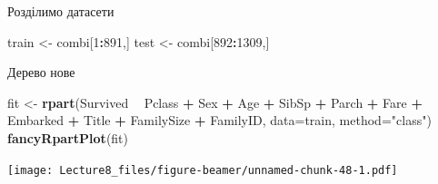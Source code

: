 \documentclass[ignorenonframetext,]{beamer}
\newenvironment{Shaded}{\begin{snugshade}}{\end{snugshade}}
\newcommand{\DataTypeTok}[1]{\textcolor[rgb]{0.13,0.29,0.53}{#1}}
\newcommand{\DecValTok}[1]{\textcolor[rgb]{0.00,0.00,0.81}{#1}}
\newcommand{\KeywordTok}[1]{\textcolor[rgb]{0.13,0.29,0.53}{\textbf{#1}}}
\newcommand{\NormalTok}[1]{#1}
\newcommand{\OperatorTok}[1]{\textcolor[rgb]{0.81,0.36,0.00}{\textbf{#1}}}
\newcommand{\StringTok}[1]{\textcolor[rgb]{0.31,0.60,0.02}{#1}}
\begin{document}
\begin{frame}[fragile]{Розділимо датасети}
\protect\hypertarget{ux440ux43eux437ux434ux456ux43bux438ux43cux43e-ux434ux430ux442ux430ux441ux435ux442ux438}{}

\begin{Shaded}
\begin{Highlighting}[]
\NormalTok{train <-}\StringTok{ }\NormalTok{combi[}\DecValTok{1}\OperatorTok{:}\DecValTok{891}\NormalTok{,]}
\NormalTok{test <-}\StringTok{ }\NormalTok{combi[}\DecValTok{892}\OperatorTok{:}\DecValTok{1309}\NormalTok{,]}
\end{Highlighting}
\end{Shaded}

\end{frame}

\begin{frame}[fragile]{Дерево нове}
\protect\hypertarget{ux434ux435ux440ux435ux432ux43e-ux43dux43eux432ux435}{}

\begin{Shaded}
\begin{Highlighting}[]
\NormalTok{fit <-}\StringTok{ }\KeywordTok{rpart}\NormalTok{(Survived }\OperatorTok{~}\StringTok{ }\NormalTok{Pclass }\OperatorTok{+}\StringTok{ }\NormalTok{Sex }\OperatorTok{+}\StringTok{ }\NormalTok{Age }\OperatorTok{+}\StringTok{ }\NormalTok{SibSp }\OperatorTok{+}\StringTok{ }\NormalTok{Parch }\OperatorTok{+}\StringTok{ }\NormalTok{Fare }\OperatorTok{+}\StringTok{ }\NormalTok{Embarked }\OperatorTok{+}\StringTok{ }\NormalTok{Title }\OperatorTok{+}\StringTok{ }\NormalTok{FamilySize }\OperatorTok{+}\StringTok{ }\NormalTok{FamilyID,}
               \DataTypeTok{data=}\NormalTok{train, }
               \DataTypeTok{method=}\StringTok{"class"}\NormalTok{)}
\KeywordTok{fancyRpartPlot}\NormalTok{(fit)}
\end{Highlighting}
\end{Shaded}

\texttt{[image: Lecture8\_files/figure-beamer/unnamed-chunk-48-1.pdf]}

\end{frame}
\end{document}
